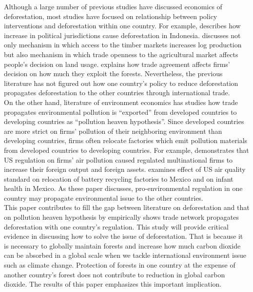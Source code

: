 \documentclass[a4paper,12pt]{article}
\begin{document}
Although a large number of previous studies have discussed economics of deforestation, most studies have focused on relationship between policy interventions and deforestation within one country. For example, \cite{burgess2012political} describes how increase in political jurisdictions cause deforestation in Indonesia. \cite{abman2020does} discusses not only mechanism in which access to the timber markets increases log production but also mechanism in which trade openness to the agricultural market affects people's decision on land usage. \cite{harstad2023contingent} explains how trade agreement affects firms' decision on how much they exploit the forests. Nevertheless, the previous literature has not figured out how one country's policy to reduce deforestation propagates deforestation to the other countries through international trade. \\

On the other hand, literature of environment economics has studies how trade propagates environmental pollution is ``exported'' from developed countries to developing countries as ``pollution heaven hypothesis''. Since developed countries are more strict on firms' pollution of their neighboring environment than developing countries, firms often relocate factories which emit pollution materials from developed countries to developing countries. For example, \cite{hanna2010us} demonstrates that US regulation on firms' air pollution caused regulated multinational firms to increase their foreign output and foreign assets. \cite{tanaka2022north} examines effect of US air quality standard on relocation of battery recycling factories to Mexico and on infant health in Mexico. As these paper discusses, pro-environmental regulation in one country may propagate environmental issue to the other countries. \\

This paper contributes to fill the gap between literature on deforestation and that on pollution heaven hypothesis by empirically shows trade network propagates deforestation with one country's regulation. This study will provide critical evidence in discussing how to solve the issue of deforestation. That is because it is necessary to globally maintain forests and increase how much carbon dioxide can be absorbed in a global scale when we tackle international environment issue such as climate change. Protection of forests in one country at the expense of another country's forest does not contribute to reduction in global carbon dioxide. The results of this paper emphasizes this important implication. \\
\end{document}
